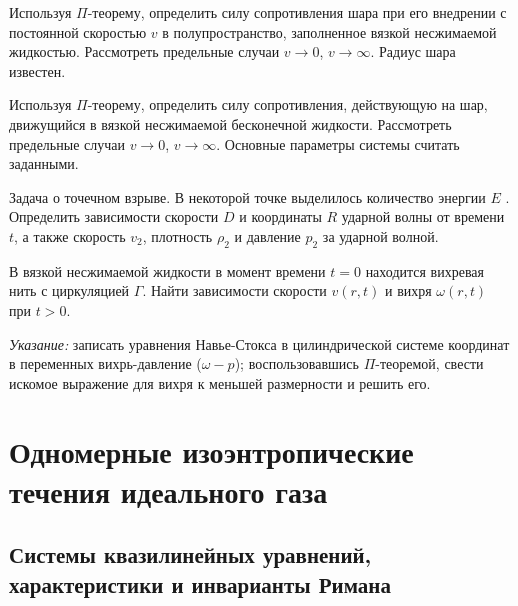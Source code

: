\documentclass[14pt]{extarticle}
\begin{document}
\begin{problems}
	
	\item Используя $\Pi$-теорему, определить силу сопротивления шара при его внедрении с постоянной скоростью $v$ в полупространство, заполненное вязкой несжимаемой жидкостью. Рассмотреть предельные случаи $v \to 0$, $v \to \infty$. Радиус шара известен.
	
	\item
	Используя  $\Pi$-теорему, определить силу сопротивления, действующую на шар, движущийся в вязкой несжимаемой бесконечной жидкости. Рассмотреть предельные случаи $v \to 0$, $v \to \infty$. Основные параметры системы считать заданными.
	
	\item
	Задача о точечном взрыве. В некоторой точке выделилось количество энергии $E$ . Определить зависимости скорости $D$ и координаты $R$ ударной волны от времени $t$, а также скорость $v_2$, плотность $\rho_2$ и давление $p_2$ за ударной волной. 

	\item 
	В вязкой несжимаемой жидкости в момент времени $t=0$ находится вихревая нить с циркуляцией $\Gamma$. Найти зависимости скорости $v(r,t)$ и вихря $\omega(r,t)$ при $t>0$.
	
	{\small \textit{Указание:} записать уравнения Навье-Стокса в цилиндрической системе координат в переменных вихрь-давление ($\omega-p$); воспользовавшись $\Pi$-теоремой, свести искомое выражение для вихря к меньшей размерности и решить его.
	
	}

\end{problems}

\newpage

\section{Одномерные изоэнтропические течения идеального газа }

\subsection{Системы квазилинейных уравнений, характеристики и инварианты Римана}
\end{document}
